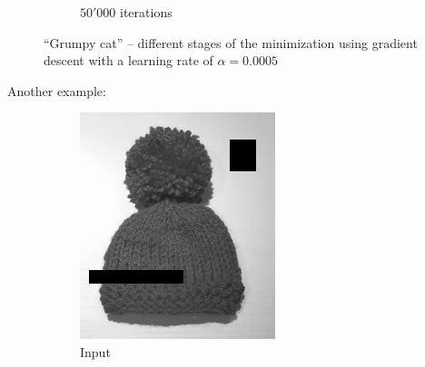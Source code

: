 \documentclass{paper}
\begin{document}
\begin{figure}[ht]
\begin{subfigure}[ht]{0.3\textwidth}
	\caption*{$50'000$ iterations}
\end{subfigure}
\caption{``Grumpy cat'' -- different stages of the minimization using gradient descent with a learning rate of $\alpha = 0.0005$}
\label{fig:results-cat}
\end{figure}
 
Another example:
\begin{figure}[ht]
\centering
\begin{subfigure}[ht]{0.45\textwidth}
	\centering
	\includegraphics[width=\textwidth]{hat-input}
	\caption*{Input}
\end{subfigure}
~
\begin{subfigure}[ht]{0.45\textwidth}
	\centering

\end{subfigure}
\end{figure}
\end{document}
